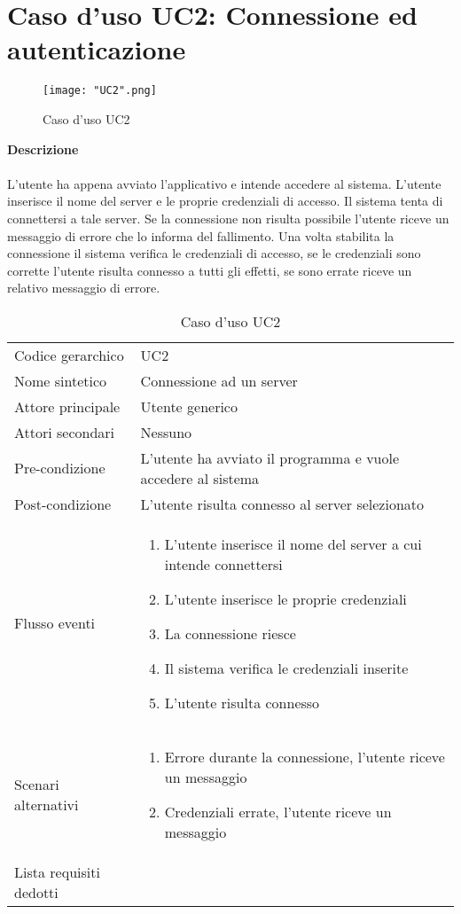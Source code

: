 \documentclass[a4paper]{report}
\begin{document}
	\section{Caso d'uso UC2: Connessione ed autenticazione}
		 	\begin{figure}[H]
				\centering
				\texttt{[image: "UC2".png]}
				\caption{Caso d'uso UC2}
			\end{figure}
		 \textbf{Descrizione} \\ \\
		 L'utente ha appena avviato l'applicativo e intende accedere al sistema. L'utente 
		 inserisce il nome del server e le proprie credenziali di accesso. Il sistema tenta di connettersi a tale
		 server. Se la connessione non risulta possibile l'utente riceve un messaggio di errore che lo informa
		 del fallimento.
		 Una volta stabilita la connessione il sistema verifica le credenziali di accesso, se le credenziali sono
		 corrette l'utente risulta connesso a tutti gli effetti, se sono errate riceve un relativo messaggio di 
		 errore.
			\begin{table}[H]
			\begin{tabularx}{\textwidth}{X | X}\toprule
				\rowcolor{orange!65}Codice gerarchico & UC2 \\
				Nome sintetico & Connessione ad un server \\
				\rowcolor{orange!65}Attore principale & Utente generico\\
				Attori secondari & Nessuno \\
				\rowcolor{orange!65}Pre-condizione & L'utente ha avviato il programma e vuole accedere al
				 sistema\\
				Post-condizione & L'utente risulta connesso al server selezionato \\
				\rowcolor{orange!65}Flusso eventi & \begin{enumerate}
				\item L'utente inserisce il nome del server a cui intende connettersi
				\item L'utente inserisce le proprie credenziali
				\item La connessione riesce
				\item Il sistema verifica le credenziali inserite
				\item L'utente risulta connesso
				\end{enumerate} \\
				Scenari alternativi & \begin{enumerate}
				\item Errore durante la connessione, l'utente riceve un messaggio
				\item Credenziali errate, l'utente riceve un messaggio
				\end{enumerate} \\
				\rowcolor{orange!65}Lista requisiti dedotti & \\
				\bottomrule
			\end{tabularx}
			\caption{Caso d'uso UC2}
		 \end{table}
\end{document}
